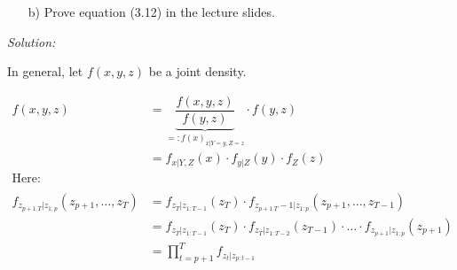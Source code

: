 \documentclass[12pt,a4paper]{article}
\begin{document}
\begin{itemize}
    \item[b)] Prove equation (3.12) in the lecture slides.
\end{itemize}

\emph{Solution:}

In general, let \(f(x,y,z)\) be a joint density.

\begin{align*}
  f(x,y,z) & = \underbrace{\dfrac{f(x,y,z)}{f(y,z)}}_{=: f(x)_{x|Y = y, Z = z}} \cdot f(y,z)\\
  & = f_{x| Y,Z} (x) \cdot f_{y|Z} (y) \cdot f_{Z} (z)
\\
\text{Here:} \\
\\
 f_{z_{p+1_:T}| z_{1:p}}(z_{p+1}, \ldots , z_{T}) & = f_{z_{T}| z_{1:T-1}} (z_{T}) \cdot f_{z_{p+1_:T}-1| z_{1:p}}(z_{p+1}, \ldots , z_{T-1}) \\
 & = f_{z_{T}| z_{1:T-1}} (z_{T})  \cdot f_{z_{T}| z_{1:T-2}} (z_{T-1}) \cdot \ldots \cdot f_{z_{p+1} | z_{1:p}} (z_{p+1}) \\
 & = \prod_{t = p +1 }^{T} f_{z_t | z_{p:t-1}} 
\end{align*}
\end{document}
